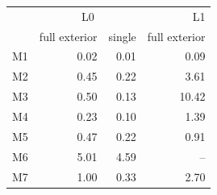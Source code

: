 \begin{tabular}{lrrr}
\toprule
 & \multicolumn{2}{c}{L0} & L1 \\
 & full exterior & single & full exterior \\
\midrule
M1 & 0.02 & 0.01 & 0.09 \\
M2 & 0.45 & 0.22 & 3.61 \\
M3 & 0.50 & 0.13 & 10.42 \\
M4 & 0.23 & 0.10 & 1.39 \\
M5 & 0.47 & 0.22 & 0.91 \\
M6 & 5.01 & 4.59 & -- \\
M7 & 1.00 & 0.33 & 2.70 \\
\bottomrule
\end{tabular}
